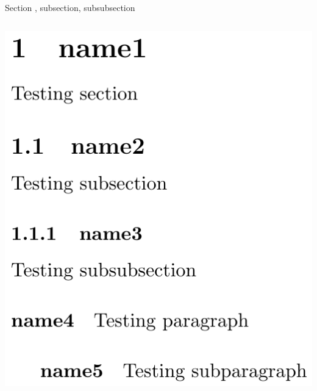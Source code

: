 \documentclass[10pt,xcolor={dvipsnames}]{beamer}
\begin{document}
\begin{frame}{Section , subsection, subsubsection}
\begin{columns}[T]
				\begin{column}{.5 \textwidth}
					\vspace{0.75cm}
					\includegraphics[width=1\textwidth]{Images/sections.png}
				\end{column}
				
			\end{columns}
		\end{frame}
	
\end{document}
